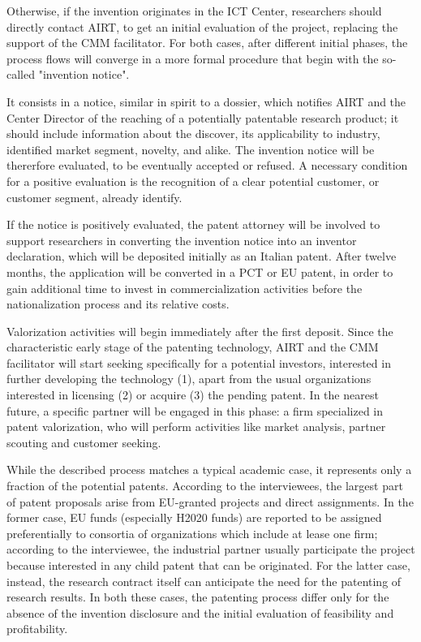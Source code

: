 Otherwise, if the invention originates in the ICT Center, researchers should directly contact AIRT, to get an initial evaluation of the project, replacing the support of the CMM facilitator. For both cases, after different initial phases, the process flows will converge in a more formal procedure that begin with the so-called "invention notice". 

It consists in a notice, similar in spirit to a dossier, which notifies AIRT and the Center Director of the reaching of a potentially patentable research product; it should include information about the discover, its applicability to industry, identified market segment, novelty, and alike. The invention notice will be thererfore evaluated, to be eventually accepted or refused. A necessary condition for a positive evaluation is the recognition of a clear potential customer, or customer segment, already identify.

If the notice is positively evaluated, the patent attorney will be involved to support researchers in converting the invention notice into an inventor declaration, which will be deposited initially as an Italian patent. After twelve months, the application will be converted in a PCT or EU patent, in order to gain additional time to invest in commercialization activities before the nationalization process and its relative costs.

Valorization activities will begin immediately after the first deposit. Since the characteristic early stage of the patenting technology, AIRT and the CMM facilitator will start seeking specifically for a potential investors, interested in further developing the technology (1), apart from the usual organizations interested in licensing (2) or acquire (3) the pending patent. In the nearest future, a specific partner will be engaged in this phase: a firm specialized in patent valorization, who will perform activities like market analysis, partner scouting and customer seeking. 

While the described process matches a typical academic case, it represents only a fraction of the potential patents. According to the interviewees, the largest part of patent proposals arise from EU-granted projects and direct assignments. In the former case, EU funds (especially H2020 funds) are reported to be assigned preferentially to consortia of organizations which include at lease one firm; according to the interviewee, the industrial partner usually participate the project because interested in any child patent that can be originated. For the latter case, instead, the research contract itself can anticipate the need for the patenting of research results. In both these cases, the patenting process differ only for the absence of the invention disclosure and the initial evaluation of feasibility and profitability.

